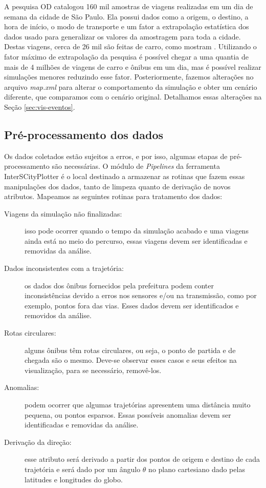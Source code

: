   A pesquisa OD catalogou 160 mil amostras de viagens realizadas em um dia de
semana da cidade de São Paulo. Ela possui dados como a origem, o destino, a
hora de início, o modo de transporte e um fator a extrapolação estatística dos
dados usado para generalizar os valores da amostragem para toda a cidade.
Destas viagens, cerca de 26 mil são feitas de carro, como mostram
\citet{santana2018courb}. Utilizando o fator máximo de extrapolação da pesquisa
é possível chegar a uma quantia de mais de 4 milhões de viagens de carro e
ônibus em um dia, mas é possível realizar simulações menores reduzindo esse
fator. Posteriormente, fazemos alterações no arquivo \emph{map.xml} para
alterar o comportamento da simulação e obter um cenário diferente, que
comparamos com o cenário original. Detalhamos essas alterações na Seção
\ref{sec:vis-eventos}.

\subsection{Pré-processamento dos dados}

  Os dados coletados estão sujeitos a erros, e por isso, algumas etapas de
pré-processamento são necessárias. O módulo de \emph{Pipelines} da ferramenta
InterSCityPlotter é o local destinado a armazenar as rotinas que fazem essas
manipulações dos dados, tanto de limpeza quanto de derivação de novos
atributos. Mapeamos as seguintes rotinas para tratamento dos dados:

\begin{description}
  \item[Viagens da simulação não finalizadas:] isso pode ocorrer
quando o tempo da simulação acabado e uma viagens ainda está no meio do percurso,
essas viagens devem ser identificadas e removidas da análise.

  \item[Dados inconsistentes com a trajetória:] os dados dos ônibus fornecidos
pela prefeitura podem conter inconsistências devido a erros nos sensores e/ou na transmissão,
como por exemplo, pontos fora das vias. Esses dados devem ser identificados e removidos da análise.

  \item[Rotas circulares:] alguns ônibus têm rotas circulares, ou seja, o ponto
de partida e de chegada são o mesmo. Deve-se observar esses casos e seus efeitos
na visualização, para se necessário, removê-los.

  \item[Anomalias:] podem ocorrer que algumas trajetórias apresentem uma distância
muito pequena, ou pontos esparsos. Essas possíveis anomalias devem ser identificadas
e removidas da análise.

  \item[Derivação da direção:] esse atributo será derivado a partir dos pontos
de origem e destino de cada trajetória e será dado por um ângulo $\theta$ no
plano cartesiano dado pelas latitudes e longitudes do globo.
\end{description}

